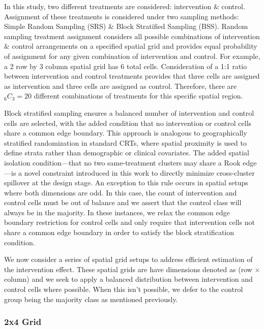 \documentclass{article}[11pt]
\begin{document}
In this study, two different treatments are considered: intervention $\&$ control. Assignment of these treatments is considered under two sampling methods: Simple Random Sampling (SRS) $\&$ Block Stratified Sampling (BSS). Random sampling treatment assignment considers all possible combinations of intervention $\&$ control arrangements on a specified spatial grid and provides equal probability of assignment for any given combination of intervention and control. For example, a 2 row by 3 column spatial grid has 6 total cells. Consideration of a 1:1 ratio between intervention and control treatments provides that three cells are assigned as intervention and three cells are assigned as control. Therefore, there are %
$_{6}C_{3}=20$ different combinations of treatments for this specific spatial region. 

Block stratified sampling ensures a balanced number of intervention and control cells are selected, with the added condition that no intervention or control cells share a common edge boundary. This approach is analogous to geographically stratified randomization in standard CRTs, where spatial proximity is used to define strata rather than demographic or clinical covariates\cite{mccann_spatial_2018}\cite{crisp_covariate-constrained_2023}\cite{hayes_cluster_2017}. The added spatial isolation condition---that no two same-treatment clusters may share a Rook edge---is a novel constraint introduced in this work to directly minimize cross-cluster spillover at the design stage. An exception to this rule occurs in spatial setups where both dimensions are odd. In this case, the count of intervention and control cells must be out of balance and we assert that the control class will always be in the majority. In these instances, we relax the common edge boundary restriction for control cells and only require that intervention cells not share a common edge boundary in order to satisfy the block stratification condition.

We now consider a series of spatial grid setups to address efficient estimation of the intervention effect. These spatial grids are have dimensions denoted as (row $\times$ column) and we seek to apply a balanced distribution between intervention and control cells where possible. When this isn't possible, we defer to the control group being the majority class as mentioned previously.

\subsubsection{2x4 Grid}
\end{document}
